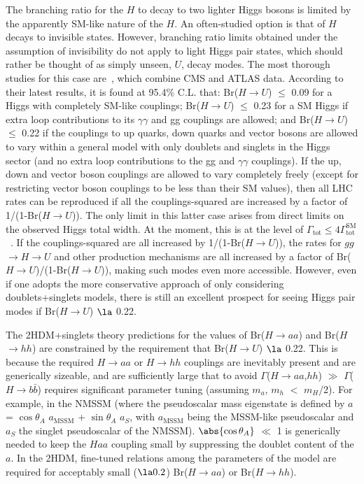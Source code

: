 The branching ratio for the $H$ to decay to two lighter Higgs bosons is limited by the apparently SM-like nature of the $H$. An often-studied option is that of $H$ decays to invisible states. However, branching ratio limits obtained under the assumption of invisibility do not apply to light Higgs pair states, which should rather be thought of as simply unseen, $U$, decay modes. The most thorough studies for this case are~\cite{Belanger:2013xza, Bernon:2014vta}, which combine CMS and ATLAS data. According to their latest results, it is found at 95.4\% C.L. that: Br($H$$\rightarrow$$U$) $\le$ 0.09 for a Higgs with completely SM-like couplings; Br($H$$\rightarrow$$U$) $\le$ 0.23 for a SM Higgs if extra loop contributions to its $\gamma\gamma$ and gg couplings are allowed; and Br($H$$\rightarrow$$U$) $\le$ 0.22 if the couplings to up quarks, down quarks and vector bosons are allowed to vary within a general model with only doublets and singlets in the Higgs sector (and no extra loop contributions to the gg and $\gamma\gamma$ couplings). If the up, down and vector boson couplings are allowed to vary completely freely (except for restricting vector boson couplings to be less than their SM values), then all LHC rates can be reproduced if all the couplings-squared are increased by a factor of 1/(1-Br($H$$\rightarrow$$U$)). The only limit in this latter case arises from direct limits on the observed Higgs total width.  At the moment, this is at the level of $\Gamma_{\text{tot}} \le 4\Gamma_{\text{tot}}^{\text{SM}}$~\cite{CMSHwidth}. If the couplings-squared are all increased by 1/(1-Br($H$$\rightarrow$$U$)), the rates for $gg$$\rightarrow$$H$$\rightarrow$$U$ and other production mechanisms are all increased by a factor of Br($H$$\rightarrow$$U$)/(1-Br($H$$\rightarrow$$U$)), making such modes even more accessible. However, even if one adopts the more conservative approach of only considering doublets+singlets models, there is still an excellent prospect for seeing Higgs pair modes if Br($H$$\rightarrow$$U$) $\la$ 0.22.

The 2HDM+singlets theory predictions for the values of Br($H$$\rightarrow$$aa$) and Br($H$$\rightarrow$$hh$) are constrained by the requirement that Br($H$$\rightarrow$$U$) $\la$ 0.22. This is because the required $H$$\rightarrow$$aa$ or $H$$\rightarrow$$hh$ couplings are inevitably present and are generically sizeable, and are sufficiently large that to avoid $\Gamma$($H$$\rightarrow$$aa$,$hh$) $\gg$ $\Gamma$($H$$\rightarrow$$b\bar{b}$) requires significant parameter tuning (assuming $m_a$, $m_h$ $<$ $m_H$/2). For example, in the NMSSM (where the pseudoscalar mass eigenstate is defined by $a$ = $\cos\theta_A$ $a_{\text{MSSM}}$ + $\sin\theta_A$ $a_S$, with $a_{\text{MSSM}}$ being the MSSM-like pseudoscalar and $a_S$ the singlet pseudoscalar of the NMSSM). $\abs{\cos\theta_A}$ $\ll$ 1 is generically needed to keep the $Haa$ coupling small by suppressing the doublet content of the $a$.  In the 2HDM, fine-tuned relations among the parameters of the model are required for acceptably small ($\la 0.2$) Br($H$$\rightarrow$$aa$) or Br($H$$\rightarrow$$hh$).

